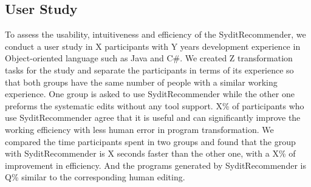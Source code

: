 \subsection{User Study}
To assess the usability, intuitiveness and efficiency of the SyditRecommender, we conduct a user study in X participants with Y years development experience in Object-oriented language such as Java and C\#. We created Z transformation tasks for the study and separate the participants in terms of its experience so that both groups have the same number of people with a similar working experience. One group is asked to use SyditRecommender while the other one preforms the systematic edits without any tool support. X\% of participants who use SyditRecommender agree that it is useful and can significantly improve the working efficiency with less human error in program transformation. We compared the time participants spent in two groups and found that the group with SyditRecommender is X seconds faster than the other one, with a X\% of improvement in efficiency. And the programs generated by SyditRecommender is Q\% similar to the corresponding human editing. 



